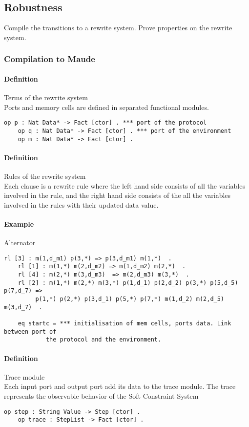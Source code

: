 \documentclass{article}
\theoremstyle{plain}
\theoremstyle{definition}
\begin{document}
\subsection{Robustness}
Compile the transitions to a rewrite system. Prove properties on the rewrite system.
\subsubsection{Compilation to Maude}
\paragraph{Definition} Terms of the rewrite system \\
Ports and memory cells are defined in separated functional modules.
\begin{lstlisting}[style=base] 
	op p : Nat Data* -> Fact [ctor] . *** port of the protocol
	op q : Nat Data* -> Fact [ctor] . *** port of the environment
	op m : Nat Data* -> Fact [ctor] .
\end{lstlisting}

\paragraph{Definition} Rules of the rewrite system \\
Each clause is a rewrite rule where the left hand side consists of all the variables involved in the rule, and the right hand side consists of the all the variables involved in the rules with their updated data value.

\paragraph{Example} Alternator \\

\begin{lstlisting}[style=base]
	rl [3] : m(1,d_m1) p(3,*) => p(3,d_m1) m(1,*)  .
	rl [1] : m(1,*) m(2,d_m2) => m(1,d_m2) m(2,*)  .
	rl [4] : m(2,*) m(3,d_m3)  => m(2,d_m3) m(3,*)  .
	rl [2] : m(1,*) m(2,*) m(3,*) p(1,d_1) p(2,d_2) p(3,*) p(5,d_5) p(7,d_7) =>
		 p(1,*) p(2,*) p(3,d_1) p(5,*) p(7,*) m(1,d_2) m(2,d_5) m(3,d_7)  .

	eq startc = *** initialisation of mem cells, ports data. Link between port of 
			the protocol and the environment.
\end{lstlisting}

\paragraph{Definition} Trace module \\
Each input port and output port add its data to the trace module. The trace represents the observable behavior of the Soft Constraint System
\begin{lstlisting}[style=base] 
	op step : String Value -> Step [ctor] .
	op trace : StepList -> Fact [ctor] .
\end{lstlisting}
\end{document}
